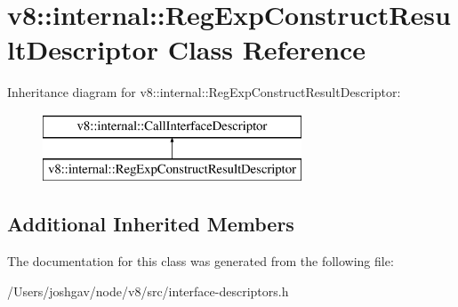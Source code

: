 \hypertarget{classv8_1_1internal_1_1_reg_exp_construct_result_descriptor}{}\section{v8\+:\+:internal\+:\+:Reg\+Exp\+Construct\+Result\+Descriptor Class Reference}
\label{classv8_1_1internal_1_1_reg_exp_construct_result_descriptor}
Inheritance diagram for v8\+:\+:internal\+:\+:Reg\+Exp\+Construct\+Result\+Descriptor\+:\begin{figure}[H]
\begin{center}
\leavevmode
\includegraphics[height=2.000000cm]{classv8_1_1internal_1_1_reg_exp_construct_result_descriptor}
\end{center}
\end{figure}
\subsection*{Additional Inherited Members}


The documentation for this class was generated from the following file\+:\begin{DoxyCompactItemize}
\item 
/\+Users/joshgav/node/v8/src/interface-\/descriptors.\+h\end{DoxyCompactItemize}
